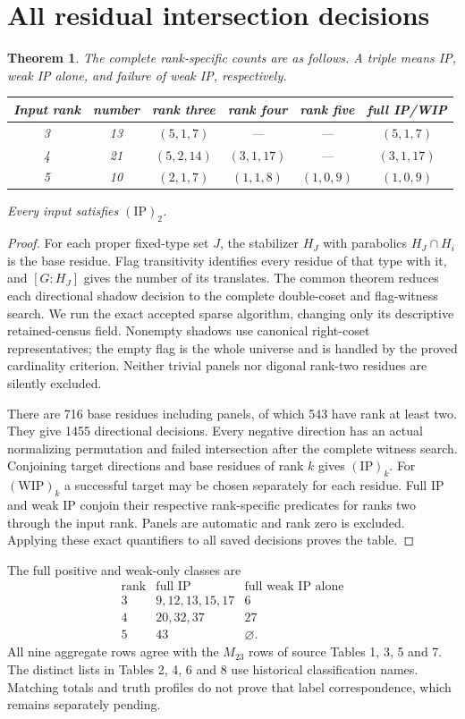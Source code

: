 \documentclass[11pt,a4paper]{article}
\newtheorem{theorem}{Theorem}
\begin{document}
\section{All residual intersection decisions}
\begin{theorem}
The complete rank-specific counts are as follows. A triple means IP,
weak IP alone, and failure of weak IP, respectively.
\begin{center}\begin{tabular}{cccccc}\toprule
Input rank&number&rank three&rank four&rank five&full IP/WIP\\\midrule
3&13&$(5,1,7)$&---&---&$(5,1,7)$\\
4&21&$(5,2,14)$&$(3,1,17)$&---&$(3,1,17)$\\
5&10&$(2,1,7)$&$(1,1,8)$&$(1,0,9)$&$(1,0,9)$\\\bottomrule
\end{tabular}\end{center}
Every input satisfies $(\mathrm{IP})_2$.
\end{theorem}
\begin{proof}
For each proper fixed-type set $J$, the stabilizer $H_J$ with parabolics
$H_J\cap H_i$ is the base residue. Flag transitivity identifies every
residue of that type with it, and $[G:H_J]$ gives the number of its
translates. The common theorem reduces each directional shadow decision
to the complete double-coset and flag-witness search. We run the exact
accepted sparse algorithm, changing only its descriptive retained-census
field. Nonempty shadows use canonical right-coset representatives; the
empty flag is the whole universe and is handled by the proved cardinality
criterion. Neither trivial panels nor digonal rank-two residues are
silently excluded.

There are 716 base residues including panels, of which 543 have rank at
least two. They give 1455 directional decisions. Every negative direction
has an actual normalizing permutation and failed intersection after the
complete witness search. Conjoining target directions and base residues
of rank $k$ gives $(\mathrm{IP})_k$. For $(\mathrm{WIP})_k$ a successful
target may be chosen separately for each residue. Full IP and weak IP
conjoin their respective rank-specific predicates for ranks two through
the input rank. Panels are automatic and rank zero is excluded. Applying
these exact quantifiers to all saved decisions proves the table.
\end{proof}
The full positive and weak-only classes are
\[
\begin{array}{c|l|l}
\text{rank}&\text{full IP}&\text{full weak IP alone}\\\hline
3&9,12,13,15,17&6\\
4&20,32,37&27\\
5&43&\varnothing.
\end{array}
\]
All nine aggregate rows agree with the $M_{23}$ rows of source Tables 1,
3, 5 and 7. The distinct lists in Tables 2, 4, 6 and 8 use historical
classification names. Matching totals and truth profiles do not prove
that label correspondence, which remains separately pending.
\end{document}
